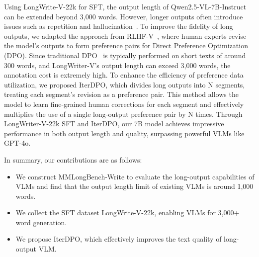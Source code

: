 Using LongWrite-V-22k for SFT, the output length of Qwen2.5-VL-7B-Instruct~\cite{Qwen2.5-VL} can be extended beyond 3,000 words. However, longer outputs often introduce issues such as repetition and hallucination~\cite{favero2024multi}. To improve the fidelity of long outputs, we adapted the approach from RLHF-V~\cite{yu2024rlhf}, where human experts revise the model's outputs to form preference pairs for Direct Preference Optimization (DPO). Since traditional DPO~\cite{rafailov2024direct} is typically performed on short texts of around 300 words, and LongWriter-V's output length can exceed 3,000 words, the annotation cost is extremely high. To enhance the efficiency of preference data utilization, we proposed IterDPO, which divides long outputs into N segments, treating each segment's revision as a preference pair. This method allows the model to learn fine-grained human corrections for each segment and effectively multiplies the use of a single long-output preference pair by N times. Through LongWriter-V-22k SFT and IterDPO, our 7B model achieves impressive performance in both output length and quality, surpassing powerful VLMs like GPT-4o.


In summary, our contributions are as follows:
\begin{itemize}
\item We construct MMLongBench-Write to evaluate the long-output capabilities of VLMs and find that the output length limit of existing VLMs is around 1,000 words.
\item We collect the SFT dataset LongWrite-V-22k, enabling VLMs for 3,000+ word generation.
\item We propose IterDPO, which effectively improves the text quality of long-output VLM.
\end{itemize}